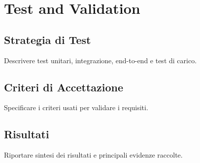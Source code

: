 \chapter{Test and Validation}

\section{Strategia di Test}
Descrivere test unitari, integrazione, end-to-end e test di carico.

\section{Criteri di Accettazione}
Specificare i criteri usati per validare i requisiti.

\section{Risultati}
Riportare sintesi dei risultati e principali evidenze raccolte.
